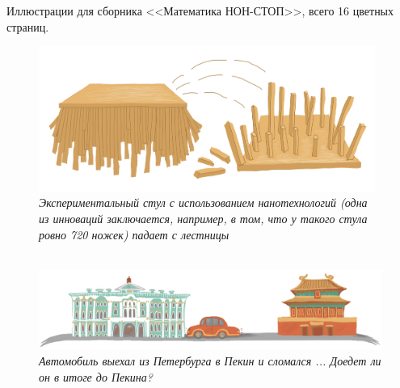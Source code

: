 \documentclass[10pt]{scrbook} \usepackage{modules/nonstahp_book}
\begin{document}
Иллюстрации для сборника <<Математика НОН-СТОП>>, всего 16 цветных страниц.

\vfill\eject

\begin{figure} \begin{center}
	\includegraphics[width=11cm]{figures/color/01c.jpg}
	\vspace{0.5cm}
	\caption{
             {\itshape  Экспериментальный стул с использованием нанотехнологий 
             (одна из инноваций заключается, например, в том, что у 
             такого стула ровно 720 ножек) падает с лестницы }\medskip\\
             \\
             }
\end{center} \end{figure}

\begin{figure} \begin{center}
	\includegraphics[width=12cm]{figures/color/15c.jpg}
	\vspace{0.5cm}
	\caption{
             {\itshape  Автомобиль выехал из Петербурга в Пекин и сломался ... %
             Доедет ли он в итоге до Пекина? }\medskip\\
             }
\end{center} \end{figure}
\end{document}
